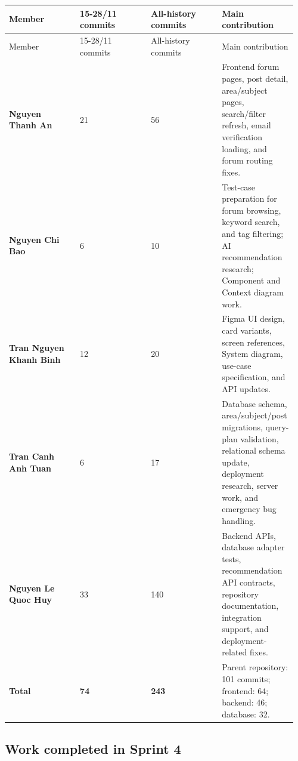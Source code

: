 \documentclass[12pt]{article}
\begin{document}
\begin{longtable}{|p{0.24\linewidth}|p{0.24\linewidth}|p{0.24\linewidth}|p{0.24\linewidth}|}
\hline
Member & 15-28/11 commits & All-history commits & Main contribution \\
\endfirsthead
\hline
Member & 15-28/11 commits & All-history commits & Main contribution \\
\endhead
\hline
\endfoot
\hline
\endlastfoot
\textbf{Nguyen Thanh An} & 21 & 56 & Frontend forum pages, post detail, area/subject pages, search/filter refresh, email verification loading, and forum routing fixes. \\
\hline
\textbf{Nguyen Chi Bao} & 6 & 10 & Test-case preparation for forum browsing, keyword search, and tag filtering; AI recommendation research; Component and Context diagram work. \\
\hline
\textbf{Tran Nguyen Khanh Binh} & 12 & 20 & Figma UI design, card variants, screen references, System diagram, use-case specification, and API updates. \\
\hline
\textbf{Tran Canh Anh Tuan} & 6 & 17 & Database schema, area/subject/post migrations, query-plan validation, relational schema update, deployment research, server work, and emergency bug handling. \\
\hline
\textbf{Nguyen Le Quoc Huy} & 33 & 140 & Backend APIs, database adapter tests, recommendation API contracts, repository documentation, integration support, and deployment-related fixes. \\
\hline
\textbf{Total} & \textbf{74} & \textbf{243} & Parent repository: 101 commits; frontend: 64; backend: 46; database: 32. \\
\hline
\end{longtable}

\subsection{Work completed in Sprint 4}
\end{document}
